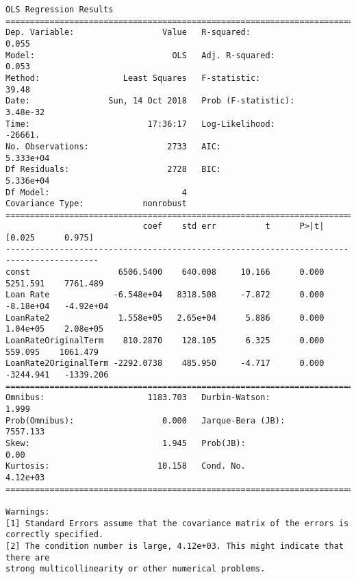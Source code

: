 \documentclass[11pt]{article}
\begin{document}
    \begin{Verbatim}[commandchars=\\\{\}]
                            OLS Regression Results                            
==============================================================================
Dep. Variable:                  Value   R-squared:                       0.055
Model:                            OLS   Adj. R-squared:                  0.053
Method:                 Least Squares   F-statistic:                     39.48
Date:                Sun, 14 Oct 2018   Prob (F-statistic):           3.48e-32
Time:                        17:36:17   Log-Likelihood:                -26661.
No. Observations:                2733   AIC:                         5.333e+04
Df Residuals:                    2728   BIC:                         5.336e+04
Df Model:                           4                                         
Covariance Type:            nonrobust                                         
=========================================================================================
                            coef    std err          t      P>|t|      [0.025      0.975]
-----------------------------------------------------------------------------------------
const                  6506.5400    640.008     10.166      0.000    5251.591    7761.489
Loan Rate             -6.548e+04   8318.508     -7.872      0.000   -8.18e+04   -4.92e+04
LoanRate2              1.558e+05   2.65e+04      5.886      0.000    1.04e+05    2.08e+05
LoanRateOriginalTerm    810.2870    128.105      6.325      0.000     559.095    1061.479
LoanRate2OriginalTerm -2292.0738    485.950     -4.717      0.000   -3244.941   -1339.206
==============================================================================
Omnibus:                     1183.703   Durbin-Watson:                   1.999
Prob(Omnibus):                  0.000   Jarque-Bera (JB):             7557.133
Skew:                           1.945   Prob(JB):                         0.00
Kurtosis:                      10.158   Cond. No.                     4.12e+03
==============================================================================

Warnings:
[1] Standard Errors assume that the covariance matrix of the errors is correctly specified.
[2] The condition number is large, 4.12e+03. This might indicate that there are
strong multicollinearity or other numerical problems.

    \end{Verbatim}
\end{document}

